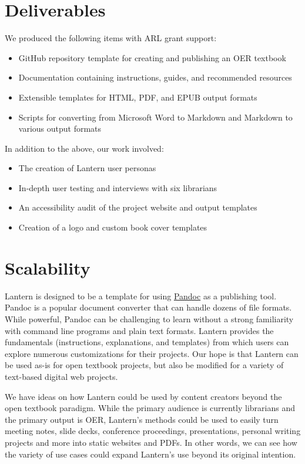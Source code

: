 \documentclass{book}
\begin{document}
\hypertarget{deliverables}{%
\section{Deliverables}\label{deliverables}}

We produced the following items with ARL grant support:

\begin{itemize}
\item
  GitHub repository template for creating and publishing an OER textbook
\item
  Documentation containing instructions, guides, and recommended resources
\item
  Extensible templates for HTML, PDF, and EPUB output formats
\item
  Scripts for converting from Microsoft Word to Markdown and Markdown to
  various output formats
\end{itemize}

In addition to the above, our work involved:

\begin{itemize}
\item
  The creation of Lantern user personas
\item
  In-depth user testing and interviews with six librarians
\item
  An accessibility audit of the project website and output templates
\item
  Creation of a logo and custom book cover templates
\end{itemize}

\hypertarget{scalability}{%
\section{Scalability}\label{scalability}}

Lantern is designed to be a template for using
\href{https://pandoc.org/}{Pandoc} as a publishing tool. Pandoc is a popular
document converter that can handle dozens of file formats. While powerful,
Pandoc can be challenging to learn without a strong familiarity with command
line programs and plain text formats. Lantern provides the fundamentals
(instructions, explanations, and templates) from which users can explore
numerous customizations for their projects. Our hope is that Lantern can be
used as-is for open textbook projects, but also be modified for a variety of
text-based digital web projects.

We have ideas on how Lantern could be used by content creators beyond the open
textbook paradigm. While the primary audience is currently librarians and the
primary output is OER, Lantern's methods could be used to easily turn meeting
notes, slide decks, conference proceedings, presentations, personal writing
projects and more into static websites and PDFs. In other words, we can see
how the variety of use cases could expand Lantern's use beyond its original
intention.
\end{document}
